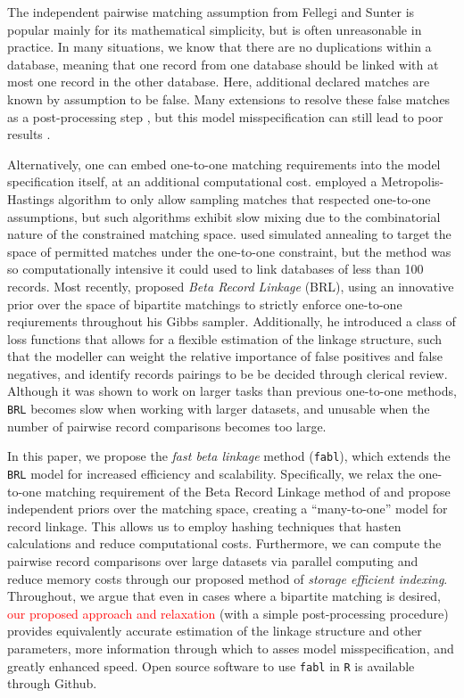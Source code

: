 \documentclass[12pt,letterpaper]{article}
\newcommand{\1}[1]{\mathbb{I}\!\left[#1\right]} %
\begin{document}
	The independent pairwise matching assumption from Fellegi and Sunter is popular mainly for its mathematical simplicity, but is often unreasonable in practice. In many situations, we know that there are no duplications within a database, meaning that one record from one database should be linked with at most one record in the other database. Here, additional declared matches are known by assumption to be false. Many extensions to \cite{fellegi_theory_1969} resolve these false matches as a post-processing step \citep{jaro1989}, but this model misspecification can still lead to poor results \citep{sadinle_bayesian_2017}.
	
	Alternatively, one can embed one-to-one matching requirements into the model specification itself, at an additional computational cost. \cite{larsen2005} employed a Metropolis-Hastings algorithm to only allow sampling matches that respected one-to-one assumptions, but such algorithms exhibit slow mixing due to the combinatorial nature of the constrained matching space. \cite{fortunato_2010} used simulated annealing to target the space of permitted matches under the one-to-one constraint, but the method was so computationally intensive it could used to link databases of less than 100 records. Most recently, \cite{sadinle_bayesian_2017} proposed \emph{Beta Record Linkage} (BRL), using an innovative prior over the space of bipartite matchings to strictly enforce one-to-one reqiurements throughout his Gibbs sampler. Additionally, he introduced a class of loss functions that allows for a flexible estimation of the linkage structure, such that the modeller can weight the relative importance of false positives and false negatives, and identify records pairings to be be decided through clerical review. Although it was shown to work on larger tasks than previous one-to-one methods, \texttt{BRL} becomes slow when working with larger datasets, and unusable when the number of pairwise record comparisons becomes too large. 
	
	In this paper, we propose the \emph{fast beta linkage} method (\texttt{fabl}), which extends the \texttt{BRL} model for increased efficiency and scalability. Specifically, we relax the one-to-one matching requirement of the Beta Record Linkage method of \citep{sadinle_bayesian_2017} and propose independent priors over the matching space, creating a ``many-to-one'' model for record linkage. This allows us to employ hashing techniques that hasten calculations and reduce computational costs. Furthermore, we can compute the pairwise record comparisons over large datasets via parallel computing and reduce memory costs through our proposed method of \emph{storage efficient indexing}. Throughout, we argue that even in cases where a bipartite matching is desired, \textcolor{red}{our proposed approach and relaxation} (with a simple post-processing procedure) provides equivalently accurate estimation of the linkage structure and other parameters, more information through which to asses model misspecification, and greatly enhanced speed. Open source software to use \texttt{fabl} in \texttt{R} is available through Github. 
	
\end{document}
